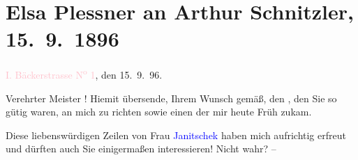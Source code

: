 

\renewcommand{\erwaehntePersonen}{Personen: Maria Janitschek, Albert Langen, Elsa Plessner, Louis Plessner}
\renewcommand{\erwaehnteOrte}{Orte: Bäckerstraße 1, Wien}
\renewcommand{\erwaehnteWerke}{Werke: Anatol, Baby, Der Begräbnißtag, Der gläserne Käfig. Skizzen und Novellen, Die Leiter der Seele, Im Feuer geprüft, Im Widerschein, Neues Wiener Journal, Simplicissimus, Warten}
\section[Elsa Plessner an Arthur Schnitzler, 15. 9. 1896]{Elsa Plessner an Arthur Schnitzler, 15. 9. 1896}
\nopagebreak{}
\rehead{ }\normalsize\beginnumbering{}
\toendnotes[C]{\smallbreak\pagebreak[2]}
\toendnotes[C]{\smallbreak}
\pstart
           {\pb}\textcolor{pink}{I. Bäckerstrasse N\textsuperscript{o}
                     1}{}\ledrightnote{\textcolor{pink}{Bäckerstraße 1}}, den 15. 9. 96. \pend
           
\pstart{}Verehrter Meister \label{K_L03702-1v}\label{}!\pend\vspace{0.5em}
\pstart
           Hiemit übersende, Ihrem Wunsch gemäß, den \label{K_L03702-2v}\label{}, den Sie so gütig waren, an mich zu richten sowie einen \label{K_L03702-3v}\label{} der mir heute Früh
               zukam.\pend
           
\pstart
           Diese liebenswürdigen Zeilen von Frau \textcolor{blue}{Janitschek}{}\ledrightnote{\textcolor{blue}{Maria Janitschek}} haben mich aufrichtig erfreut und dürften auch Sie einigermaßen
               interessieren! Nicht wahr? –\pend
           
